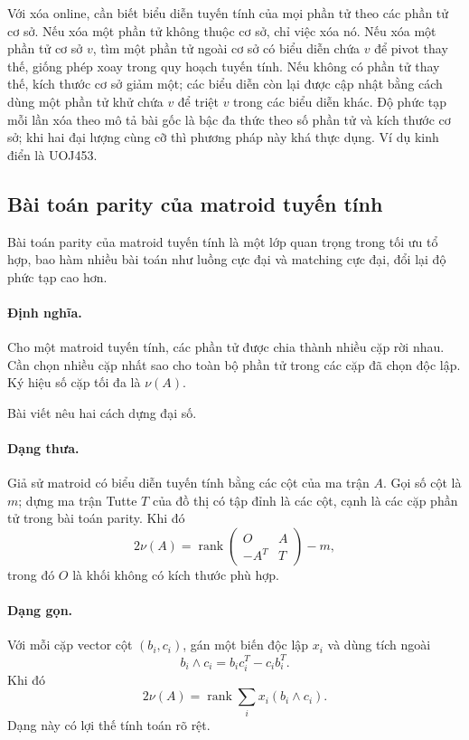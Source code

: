 \documentclass[11pt]{article}
\begin{document}
Với xóa online, cần biết biểu diễn tuyến tính của mọi phần tử theo các phần tử
cơ sở. Nếu xóa một phần tử không thuộc cơ sở, chỉ việc xóa nó. Nếu xóa một phần
tử cơ sở $v$, tìm một phần tử ngoài cơ sở có biểu diễn chứa $v$ để pivot thay
thế, giống phép xoay trong quy hoạch tuyến tính. Nếu không có phần tử thay thế,
kích thước cơ sở giảm một; các biểu diễn còn lại được cập nhật bằng cách dùng
một phần tử khử chứa $v$ để triệt $v$ trong các biểu diễn khác. Độ phức tạp mỗi
lần xóa theo mô tả bài gốc là bậc đa thức theo số phần tử và kích thước cơ sở;
khi hai đại lượng cùng cỡ thì phương pháp này khá thực dụng. Ví dụ kinh điển là
UOJ453.

\subsection{Bài toán parity của matroid tuyến tính}

Bài toán parity của matroid tuyến tính là một lớp quan trọng trong tối ưu tổ
hợp, bao hàm nhiều bài toán như luồng cực đại và matching cực đại, đổi lại độ
phức tạp cao hơn.

\paragraph{Định nghĩa.}
Cho một matroid tuyến tính, các phần tử được chia thành nhiều cặp rời nhau. Cần
chọn nhiều cặp nhất sao cho toàn bộ phần tử trong các cặp đã chọn độc lập. Ký
hiệu số cặp tối đa là $\nu(A)$.

Bài viết nêu hai cách dựng đại số.

\paragraph{Dạng thưa.}
Giả sử matroid có biểu diễn tuyến tính bằng các cột của ma trận \(A\). Gọi số
cột là \(m\); dựng ma trận Tutte \(T\) của đồ thị có tập đỉnh là các cột, cạnh
là các cặp phần tử trong bài toán parity. Khi đó
\[
  2\nu(A)=\operatorname{rank}
  \begin{pmatrix}
  O&A\\ -A^T&T
  \end{pmatrix}
  -m,
\]
trong đó \(O\) là khối không có kích thước phù hợp.

\paragraph{Dạng gọn.}
Với mỗi cặp vector cột \((b_i,c_i)\), gán một biến độc lập \(x_i\) và dùng tích
ngoài
\[
  b_i\wedge c_i=b_ic_i^T-c_ib_i^T.
\]
Khi đó
\[
  2\nu(A)=
  \operatorname{rank}\sum_i x_i(b_i\wedge c_i).
\]
Dạng này có lợi thế tính toán rõ rệt.
\end{document}
